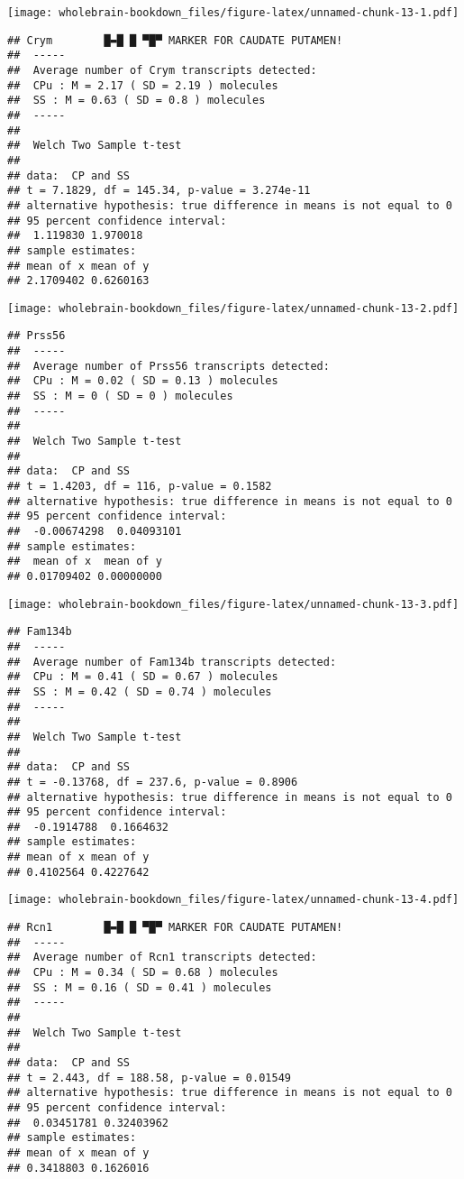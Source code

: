\documentclass[]{book}
\theoremstyle{definition}
\theoremstyle{definition}
\theoremstyle{remark}
\begin{document}
\texttt{[image: wholebrain-bookdown\_files/figure-latex/unnamed-chunk-13-1.pdf]}

\begin{verbatim}
## Crym        █▬█ █ ▀█▀ MARKER FOR CAUDATE PUTAMEN!
##  -----
##  Average number of Crym transcripts detected:
##  CPu : M = 2.17 ( SD = 2.19 ) molecules 
##  SS : M = 0.63 ( SD = 0.8 ) molecules
##  -----
## 
##  Welch Two Sample t-test
## 
## data:  CP and SS
## t = 7.1829, df = 145.34, p-value = 3.274e-11
## alternative hypothesis: true difference in means is not equal to 0
## 95 percent confidence interval:
##  1.119830 1.970018
## sample estimates:
## mean of x mean of y 
## 2.1709402 0.6260163
\end{verbatim}

\texttt{[image: wholebrain-bookdown\_files/figure-latex/unnamed-chunk-13-2.pdf]}

\begin{verbatim}
## Prss56
##  -----
##  Average number of Prss56 transcripts detected:
##  CPu : M = 0.02 ( SD = 0.13 ) molecules 
##  SS : M = 0 ( SD = 0 ) molecules
##  -----
## 
##  Welch Two Sample t-test
## 
## data:  CP and SS
## t = 1.4203, df = 116, p-value = 0.1582
## alternative hypothesis: true difference in means is not equal to 0
## 95 percent confidence interval:
##  -0.00674298  0.04093101
## sample estimates:
##  mean of x  mean of y 
## 0.01709402 0.00000000
\end{verbatim}

\texttt{[image: wholebrain-bookdown\_files/figure-latex/unnamed-chunk-13-3.pdf]}

\begin{verbatim}
## Fam134b
##  -----
##  Average number of Fam134b transcripts detected:
##  CPu : M = 0.41 ( SD = 0.67 ) molecules 
##  SS : M = 0.42 ( SD = 0.74 ) molecules
##  -----
## 
##  Welch Two Sample t-test
## 
## data:  CP and SS
## t = -0.13768, df = 237.6, p-value = 0.8906
## alternative hypothesis: true difference in means is not equal to 0
## 95 percent confidence interval:
##  -0.1914788  0.1664632
## sample estimates:
## mean of x mean of y 
## 0.4102564 0.4227642
\end{verbatim}

\texttt{[image: wholebrain-bookdown\_files/figure-latex/unnamed-chunk-13-4.pdf]}

\begin{verbatim}
## Rcn1        █▬█ █ ▀█▀ MARKER FOR CAUDATE PUTAMEN!
##  -----
##  Average number of Rcn1 transcripts detected:
##  CPu : M = 0.34 ( SD = 0.68 ) molecules 
##  SS : M = 0.16 ( SD = 0.41 ) molecules
##  -----
## 
##  Welch Two Sample t-test
## 
## data:  CP and SS
## t = 2.443, df = 188.58, p-value = 0.01549
## alternative hypothesis: true difference in means is not equal to 0
## 95 percent confidence interval:
##  0.03451781 0.32403962
## sample estimates:
## mean of x mean of y 
## 0.3418803 0.1626016
\end{verbatim}
\end{document}

